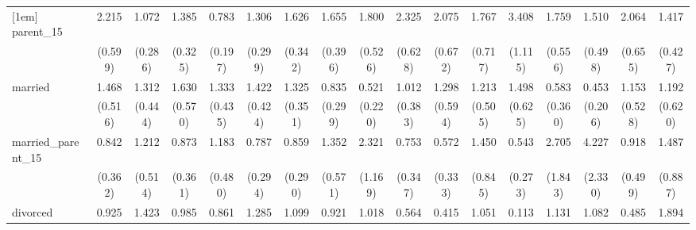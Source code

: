{\begin{tabular}{l*{16}{c}}
[1em]
parent\_15           &       2.215\sym{**} &       1.072         &       1.385         &       0.783         &       1.306         &       1.626\sym{*}  &       1.655\sym{*}  &       1.800\sym{*}  &       2.325\sym{**} &       2.075\sym{*}  &       1.767         &       3.408\sym{***}&       1.759         &       1.510         &       2.064\sym{*}  &       1.417         \\
                    &     (0.599)         &     (0.286)         &     (0.325)         &     (0.197)         &     (0.299)         &     (0.342)         &     (0.396)         &     (0.526)         &     (0.628)         &     (0.672)         &     (0.717)         &     (1.115)         &     (0.556)         &     (0.498)         &     (0.655)         &     (0.427)         \\
[1em]
married             &       1.468         &       1.312         &       1.630         &       1.333         &       1.422         &       1.325         &       0.835         &       0.521         &       1.012         &       1.298         &       1.213         &       1.498         &       0.583         &       0.453         &       1.153         &       1.192         \\
                    &     (0.516)         &     (0.444)         &     (0.570)         &     (0.435)         &     (0.424)         &     (0.351)         &     (0.299)         &     (0.220)         &     (0.383)         &     (0.594)         &     (0.505)         &     (0.625)         &     (0.360)         &     (0.206)         &     (0.528)         &     (0.620)         \\
[1em]
married\_parent\_15   &       0.842         &       1.212         &       0.873         &       1.183         &       0.787         &       0.859         &       1.352         &       2.321         &       0.753         &       0.572         &       1.450         &       0.543         &       2.705         &       4.227\sym{**} &       0.918         &       1.487         \\
                    &     (0.362)         &     (0.514)         &     (0.361)         &     (0.480)         &     (0.294)         &     (0.290)         &     (0.571)         &     (1.169)         &     (0.347)         &     (0.333)         &     (0.845)         &     (0.273)         &     (1.843)         &     (2.330)         &     (0.499)         &     (0.887)         \\
[1em]
divorced            &       0.925         &       1.423         &       0.985         &       0.861         &       1.285         &       1.099         &       0.921         &       1.018         &       0.564         &       0.415         &       1.051         &       0.113\sym{*}  &       1.131         &       1.082         &       0.485         &       1.894         \\

\end{tabular}}

